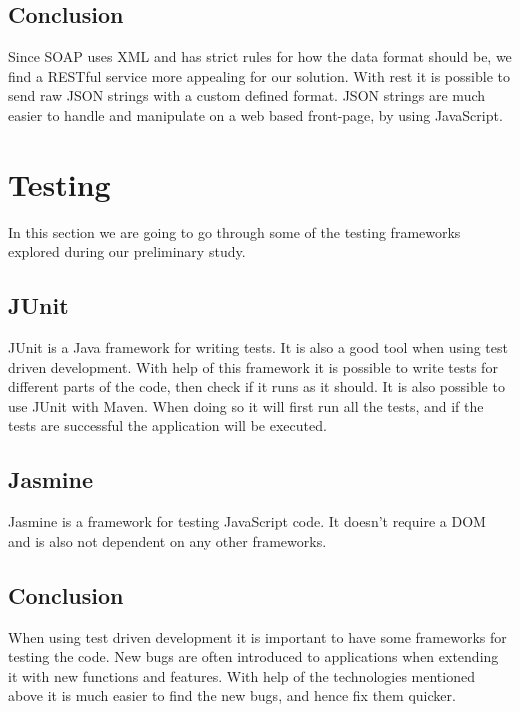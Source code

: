 \subsection{Conclusion}

Since SOAP uses XML and has strict rules for how the data format should be, we find a RESTful service more appealing for our solution.
With rest it is possible to send raw JSON strings with a custom defined format.
JSON strings are much easier to handle and manipulate on a web based front-page, by using JavaScript.

\section{Testing}
\label{section:testing}

In this section we are going to go through some of the testing frameworks explored during our preliminary study.

\subsection{JUnit}

JUnit is a Java framework for writing tests. It is also a good tool when using test driven development.
With help of this framework it is possible to write tests for different parts of the code, then check if it runs as it should.
It is also possible to use JUnit with Maven.
When doing so it will first run all the tests, and if the tests are successful the application will be executed. \cite{JUnit}

\subsection{Jasmine}

Jasmine is a framework for testing JavaScript code.	
It doesn't require a DOM and is also not dependent on any other frameworks. \cite{Jasmine}

\subsection{Conclusion}

When using test driven development it is important to have some frameworks for testing the code.
New bugs are often introduced to applications when extending it with new functions and features.
With help of the technologies mentioned above it is much easier to find the new bugs, and hence fix them quicker.